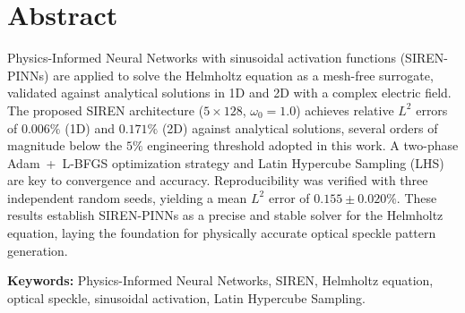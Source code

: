 
\chapter*{Abstract}

\vspace*{-8mm}

Physics-Informed Neural Networks with sinusoidal activation functions
(SIREN-PINNs) are applied to solve the Helmholtz equation as a mesh-free
surrogate, validated against analytical solutions in 1D and 2D with a
complex electric field. The proposed SIREN architecture ($5 \times 128$,
$\omega_0 = 1.0$) achieves relative $L^2$ errors of $0.006\%$ (1D) and
$0.171\%$ (2D) against analytical solutions, several orders of magnitude
below the $5\%$ engineering threshold adopted in this work.
A two-phase Adam~+~L-BFGS optimization strategy and Latin Hypercube Sampling
(LHS) are key to convergence and accuracy.
Reproducibility was verified with three independent random seeds, yielding a
mean $L^2$ error of $0.155 \pm 0.020\%$.
These results establish SIREN-PINNs as a precise and stable solver for the
Helmholtz equation, laying the foundation for physically accurate optical
speckle pattern generation.

\bigskip

\noindent\textbf{Keywords:} Physics-Informed Neural Networks, SIREN,
Helmholtz equation, optical speckle, sinusoidal activation, Latin Hypercube
Sampling.
